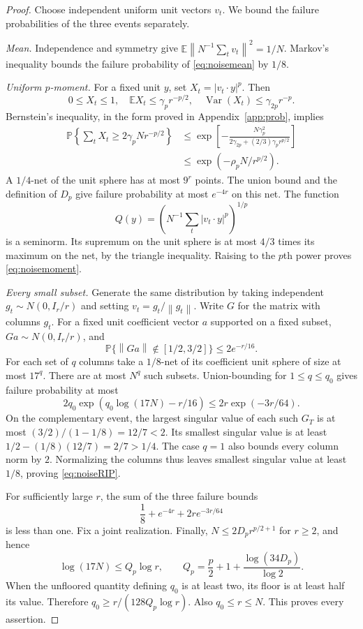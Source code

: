 \documentclass[11pt,letterpaper]{article}
\theoremstyle{definition}
\theoremstyle{remark}
\numberwithin{equation}{section}
\newcommand{\E}{\mathbb E}
\newcommand{\Prob}{\mathbb P}
\newcommand{\norm}[1]{\left\lVert#1\right\rVert}
\begin{document}
\begin{proof}
Choose independent uniform unit vectors $v_t$. We bound the failure probabilities of the three events separately.

\textit{Mean.} Independence and symmetry give $\E\norm{N^{-1}\sum_tv_t}^2=1/N$. Markov's inequality bounds the failure probability of \eqref{eq:noisemean} by $1/8$.

\textit{Uniform $p$-moment.} For a fixed unit $y$, set $X_t=|v_t\cdot y|^p$. Then
\[
 0\le X_t\le1,\quad \E X_t\le\gamma_pr^{-p/2},\quad
 \operatorname{Var}(X_t)\le\gamma_{2p}r^{-p}.
\]
Bernstein's inequality, in the form proved in Appendix~\ref{app:prob}, implies
\begin{align*}
 \Prob\!\left\{\sum_tX_t\ge2\gamma_pNr^{-p/2}\right\}
 &\le\exp\!\left[-\frac{N\gamma_p^2}{2\gamma_{2p}+(2/3)\gamma_pr^{p/2}}\right]\\
 &\le\exp(-\rho_pN/r^{p/2}).
\end{align*}
A $1/4$-net of the unit sphere has at most $9^r$ points. The union bound and the definition of $D_p$ give failure probability at most $e^{-4r}$ on this net. The function
\[
 Q(y)=\left(N^{-1}\sum_t|v_t\cdot y|^p\right)^{1/p}
\]
is a seminorm. Its supremum on the unit sphere is at most $4/3$ times its maximum on the net, by the triangle inequality. Raising to the $p$th power proves \eqref{eq:noisemoment}.

\textit{Every small subset.} Generate the same distribution by taking independent $g_t\sim N(0,I_r/r)$ and setting $v_t=g_t/\norm{g_t}$. Write $G$ for the matrix with columns $g_t$. For a fixed unit coefficient vector $a$ supported on a fixed subset, $Ga\sim N(0,I_r/r)$, and
\[
 \Prob\{\norm{Ga}\notin[1/2,3/2]\}\le2e^{-r/16}.
\]
For each set of $q$ columns take a $1/8$-net of its coefficient unit sphere of size at most $17^q$. There are at most $N^q$ such subsets. Union-bounding for $1\le q\le q_0$ gives failure probability at most
\begin{equation}\label{eq:noiseunion}
 2q_0\exp(q_0\log(17N)-r/16)
 \le2r\exp(-3r/64).
\end{equation}
On the complementary event, the largest singular value of each such $G_T$ is at most $(3/2)/(1-1/8)=12/7<2$. Its smallest singular value is at least $1/2-(1/8)(12/7)=2/7>1/4$. The case $q=1$ also bounds every column norm by $2$. Normalizing the columns thus leaves smallest singular value at least $1/8$, proving \eqref{eq:noiseRIP}.

For sufficiently large $r$, the sum of the three failure bounds
\[
 \frac18+e^{-4r}+2re^{-3r/64}
\]
is less than one. Fix a joint realization. Finally, $N\le2D_pr^{p/2+1}$ for $r\ge2$, and hence
\[
 \log(17N)\le Q_p\log r,\qquad
 Q_p=\frac p2+1+\frac{\log(34D_p)}{\log2}.
\]
When the unfloored quantity defining $q_0$ is at least two, its floor is at least half its value. Therefore $q_0\ge r/(128Q_p\log r)$. Also $q_0\le r\le N$. This proves every assertion.
\end{proof}
\end{document}
